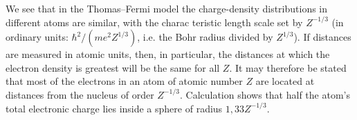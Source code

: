 We see that in the Thomas--Fermi model the charge-density distributions in different atoms are similar, with the charac%
teristic length scale set by $Z^{-1/3}$ (in ordinary units: $\hbar^2/(me^2Z^{1/3})$, i.e. the Bohr radius divided by $Z^{1/3}$). If distances are measured in atomic units, then, in particular, the distances at which the electron density is greatest will be the same for all $Z$. It may therefore be stated that most of the electrons in an atom of atomic number $Z$ are located at distances from the nucleus of order $Z^{-1/3}$. Calculation shows that half the atom's total electronic charge lies inside a sphere of radius $1{,}33Z^{-1/3}$.
